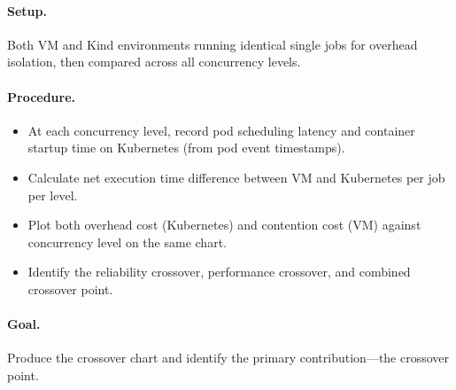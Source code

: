 \paragraph{Setup.} Both VM and Kind environments running identical single jobs for overhead isolation, then compared across all concurrency levels.

\paragraph{Procedure.}

\begin{itemize}
  \item At each concurrency level, record pod scheduling latency and container startup time on Kubernetes (from pod event timestamps).
  \item Calculate net execution time difference between VM and Kubernetes per job per level.
  \item Plot both overhead cost (Kubernetes) and contention cost (VM) against concurrency level on the same chart.
  \item Identify the reliability crossover, performance crossover, and combined crossover point.
\end{itemize}

\paragraph{Goal.} Produce the crossover chart and identify the primary contribution---the crossover point.
